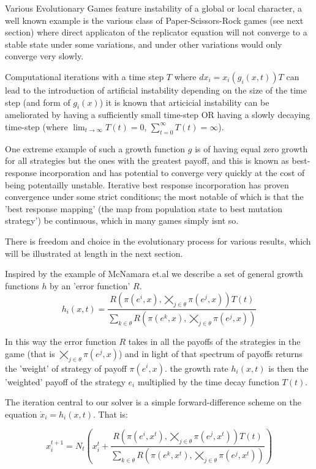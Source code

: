 \documentclass[journal,article,accept,oneauthors,pdftex,10pt,a4paper]{mdpi}
\begin{document}
Various Evolutionary Games feature instability of a global or local character, a well known example is the various class of Paper-Scissors-Rock games\cite{rockpaperscissors} (see next section) where direct applicaton of the replicator equation will not converge to a stable state under some variations, and under other variations would only converge very slowly.

Computational iterations with a time step $T$ where $dx_i=x_i(g_i(x,t)) T$ can lead to the introduction of artificial instability depending on the size of the time step (and form of $g_i(x)$) it is known that articicial instability can be ameliorated by having a sufficiently small time-step OR having a slowly decaying time-step (where $\lim_{t\rightarrow\infty}T(t)=0$, $\sum_{t=0}^\infty T(t)=\infty$).\cite{errors1}

One extreme example of such a growth function $g$ is of having equal zero growth for all strategies but the ones with the greatest payoff, and this is known as best-response incorporation and has potential to converge very quickly at the cost of being potentailly unstable.
Iterative best response incorporation has proven convergence under some strict conditions; the most notable of which is that the 'best response mapping' (the map from population state to best mutation strategy') be continuous, which in many games simply isnt so.\cite{nash1}\cite{errors1}

There is freedom and choice in the evolutionary process for various results, which will be illustrated at length in the next section.

Inspired by the example of McNamara et.al\cite{errors1} we describe a set of general growth functions $h$ by an 'error function' $R$.
$$ h_i(x,t) = \frac{R(\pi(e^i,x),\bigtimes_{j\in\theta}\pi(e^j,x))T(t)}{\sum_{k\in\theta} R(\pi(e^k,x),\bigtimes_{j\in\theta}\pi(e^j,x))} $$

In this way the error function $R$ takes in all the payoffs of the strategies in the game (that is $\bigtimes_{j\in\theta}\pi(e^j,x)$) and in light of that spectrum of payoffs returns the 'weight' of strategy of payoff $\pi(e^i,x)$.
the growth rate $h_i(x,t)$ is then the 'weighted' payoff of the strategy $e_i$ multiplied by the time decay function $T(t)$.

The iteration central to our solver is a simple forward-difference scheme on the equation $\dot{x}_i=h_i(x,t)$.
That is:

$$\boxed{x^{t+1}_i = N_t\left(x^t_i + \frac{R(\pi(e^i,x^t),\bigtimes_{j\in\theta}\pi(e^j,x^t))T(t)}{\sum_{k\in\theta} R(\pi(e^k,x^t),\bigtimes_{j\in\theta}\pi(e^j,x^t))} \right)} $$
\end{document}
